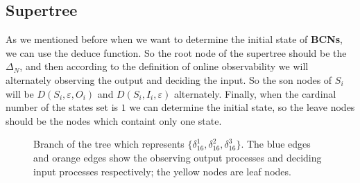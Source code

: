 \documentclass[letterpaper, 10 pt, conference]{ieeeconf}  %
\begin{document}
\subsection{Supertree} As we mentioned before when we want to determine the initial state of {\bf BCNs}, we can use the deduce function. So the root node of the supertree should be the $\Delta_N$, and then according to the definition of online observability we will alternately observing the output and deciding the input. So the son nodes of $S_i$ will be $D\left(S_i,\varepsilon, O_i\right)$ and $D\left(S_i,I_i,\varepsilon\right)$ alternately. Finally, when the  cardinal number of the states set is $1$ we can determine the initial state, so the leave nodes should be the nodes which containt only one state.
  \begin{figure}[thpb]
      \centering
      
      \caption{Branch of the tree which represents $\{\delta_{16}^1,\delta_{16}^2,\delta_{16}^3\}$. The blue edges and orange edges show the observing output processes and deciding input processes respectively; the yellow nodes are leaf nodes.}
      \label{fig:3}
   \end{figure}
\end{document}
